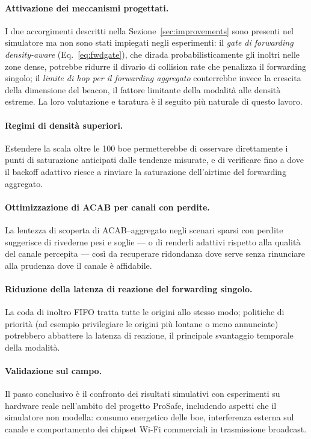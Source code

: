 \paragraph{Attivazione dei meccanismi progettati.} I due accorgimenti
descritti nella Sezione~\ref{sec:improvements} sono presenti nel simulatore
ma non sono stati impiegati negli esperimenti: il \emph{gate di forwarding
density-aware} (Eq.~\ref{eq:fwdgate}), che dirada probabilisticamente gli
inoltri nelle zone dense, potrebbe ridurre il divario di collision rate che
penalizza il forwarding singolo; il \emph{limite di hop per il forwarding
aggregato} conterrebbe invece la crescita della dimensione del beacon,
il fattore limitante della modalit\`a alle densit\`a estreme. La loro
valutazione e taratura \`e il seguito pi\`u naturale di questo lavoro.

\paragraph{Regimi di densit\`a superiori.} Estendere la scala oltre le 100
boe permetterebbe di osservare direttamente i punti di saturazione anticipati
dalle tendenze misurate, e di verificare fino a dove il backoff adattivo
riesce a rinviare la saturazione dell'airtime del forwarding aggregato.

\paragraph{Ottimizzazione di ACAB per canali con perdite.} La lentezza di
scoperta di ACAB--aggregato negli scenari sparsi con perdite suggerisce di
rivederne pesi e soglie --- o di renderli adattivi rispetto alla qualit\`a
del canale percepita --- cos\`i da recuperare ridondanza dove serve senza
rinunciare alla prudenza dove il canale \`e affidabile.

\paragraph{Riduzione della latenza di reazione del forwarding singolo.} La
coda di inoltro FIFO tratta tutte le origini allo stesso modo; politiche di
priorit\`a (ad esempio privilegiare le origini pi\`u lontane o meno
annunciate) potrebbero abbattere la latenza di reazione, il principale
svantaggio temporale della modalit\`a.

\paragraph{Validazione sul campo.} Il passo conclusivo \`e il confronto dei
risultati simulativi con esperimenti su hardware reale nell'ambito del
progetto ProSafe, includendo aspetti che il simulatore non modella: consumo
energetico delle boe, interferenza esterna sul canale e comportamento dei
chipset Wi-Fi commerciali in trasmissione broadcast.


